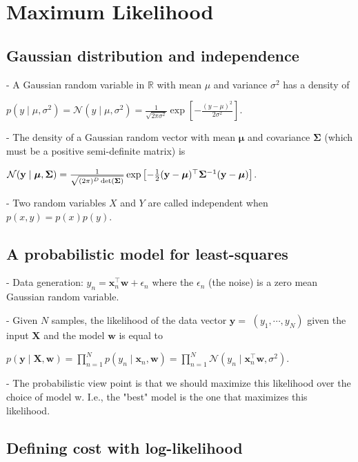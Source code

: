 \section*{Maximum Likelihood}

\subsection*{Gaussian distribution and independence}
- A Gaussian random variable in $\mathbb{R}$ with mean $\mu$ and variance $\sigma^{2}$ has a density of

$p\left(y \mid \mu, \sigma^{2}\right)=\mathcal{N}\left(y \mid \mu, \sigma^{2}\right)=\frac{1}{\sqrt{2 \pi \sigma^{2}}} \exp \left[-\frac{(y-\mu)^{2}}{2 \sigma^{2}}\right]$.

- The density of a Gaussian random vector with mean $\boldsymbol{\mu}$ and covariance $\boldsymbol{\Sigma}$ (which must be a positive semi-definite matrix) is

$\mathcal{N}(\mathbf{y} \mid \boldsymbol{\mu}, \boldsymbol{\Sigma})\\=\frac{1}{\sqrt{(2 \pi)^{D} \operatorname{det}(\boldsymbol{\Sigma})}} \exp \left[-\frac{1}{2}(\mathbf{y}-\boldsymbol{\mu})^{\top} \boldsymbol{\Sigma}^{-1}(\mathbf{y}-\boldsymbol{\mu})\right]$.

- Two random variables $X$ and $Y$ are called independent when $p(x, y)=p(x) p(y)$.

\subsection*{A probabilistic model for least-squares}

- Data generation: $
y_{n}=\mathbf{x}_{n}^{\top} \mathbf{w}+\epsilon_{n}
$ where the $\epsilon_{n}$ (the noise) is a zero mean Gaussian random variable.

- Given $N$ samples, the likelihood of the data vector $\mathbf{y}=$ $\left(y_{1}, \cdots, y_{N}\right)$ given the input $\mathbf{X}$ and the model $\mathbf{w}$ is equal to

$p(\mathbf{y} \mid \mathbf{X}, \mathbf{w})=\prod_{n=1}^{N} p\left(y_{n} \mid \mathbf{x}_{n}, \mathbf{w}\right)=\prod_{n=1}^{N} \mathcal{N}\left(y_{n} \mid \mathbf{x}_{n}^{\top} \mathbf{w}, \sigma^{2}\right)$.

- The probabilistic view point is that we should maximize this likelihood over the choice of model w. I.e., the "best" model is the one that maximizes this likelihood.

\subsection*{Defining cost with log-likelihood}

